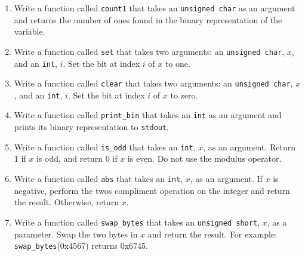 \documentclass[12pt]{article}
\begin{document}
\begin{enumerate}
  \item Write a function called \texttt{count1} that takes an \texttt{unsigned
    char} as an argument and returns the number of ones found in the binary
    representation of the variable.
  \item Write a function called \texttt{set} that takes two arguments: an
    \texttt{unsigned char}, $x$, and an \texttt{int}, $i$. Set
    the bit at index $i$ of $x$ to one.
  \item Write a function called \texttt{clear} that takes two arguments: an
    \texttt{unsigned char}, $x$, and an \texttt{int}, $i$. Set
    the bit at index $i$ of $x$ to zero.
  \item Write a function called \texttt{print\_bin} that takes an \texttt{int}
    as an argument and prints its binary representation to \texttt{stdout}.
  \item Write a function called \texttt{is\_odd} that takes an \texttt{int},
    $x$, as an argument. Return $1$ if $x$ is odd, and return $0$ if $x$ is
    even. Do not use the modulus operator.
  \item Write a function called \texttt{abs} that takes an
    \texttt{int}, $x$, as an argument. If $x$ is negative, perform the twos compliment operation on
    the integer and return the result. Otherwise, return $x$.
  \item Write a function called \texttt{swap\_bytes} that takes an
    \texttt{unsigned short}, $x$, as a parameter. Swap the two bytes in $x$ and
    return the result. For example: \texttt{swap\_bytes}(0x4567) returns
    0x6745.
\end{enumerate}
\end{document}
